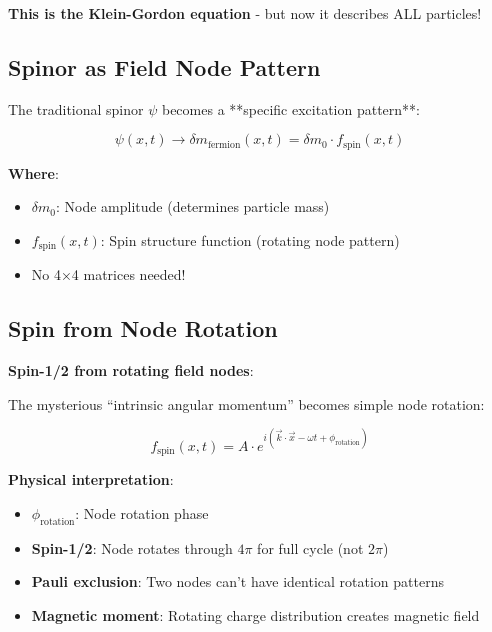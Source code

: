 \documentclass[12pt,a4paper]{article}
\newcommand{\deltam}{\delta m}
\theoremstyle{definition}
\theoremstyle{remark}
\begin{document}
	\textbf{This is the Klein-Gordon equation} - but now it describes ALL particles!
	
	\subsection{Spinor as Field Node Pattern}
	
	The traditional spinor $\psi$ becomes a **specific excitation pattern**:
	
	\begin{equation}
		\psi(x,t) \rightarrow \deltam_{\text{fermion}}(x,t) = \deltam_0 \cdot f_{\text{spin}}(x,t)
		\label{eq:spinor_to_node}
	\end{equation}
	
	\textbf{Where}:
	\begin{itemize}
		\item $\deltam_0$: Node amplitude (determines particle mass)
		\item $f_{\text{spin}}(x,t)$: Spin structure function (rotating node pattern)
		\item No 4×4 matrices needed!
	\end{itemize}
	
	\subsection{Spin from Node Rotation}
	
	\textbf{Spin-1/2 from rotating field nodes}:
	
	The mysterious ``intrinsic angular momentum'' becomes simple node rotation:
	
	\begin{equation}
		f_{\text{spin}}(x,t) = A \cdot e^{i(\vec{k} \cdot \vec{x} - \omega t + \phi_{\text{rotation}})}
		\label{eq:rotating_node}
	\end{equation}
	
	\textbf{Physical interpretation}:
	\begin{itemize}
		\item \textbf{$\phi_{\text{rotation}}$}: Node rotation phase
		\item \textbf{Spin-1/2}: Node rotates through $4\pi$ for full cycle (not $2\pi$)
		\item \textbf{Pauli exclusion}: Two nodes can't have identical rotation patterns
		\item \textbf{Magnetic moment}: Rotating charge distribution creates magnetic field
	\end{itemize}
	
\end{document}
